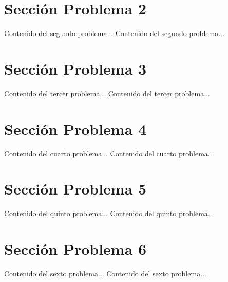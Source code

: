 \documentclass{IEEEcsmag}
\begin{document}
\section{Sección Problema 2}
Contenido del segundo problema...
\newpage
Contenido del segundo problema...
\newpage


\section{Sección Problema 3}
Contenido del tercer problema...
\newpage 
Contenido del tercer problema...
\newpage 


\section{Sección Problema 4}
Contenido del cuarto problema...
\newpage 
Contenido del cuarto problema...
\newpage 


\section{Sección Problema 5}
Contenido del quinto problema...
\newpage 
Contenido del quinto problema...
\newpage 


\section{Sección Problema 6}
Contenido del sexto problema...
\newpage 
Contenido del sexto problema...
\newpage 
\end{document}
